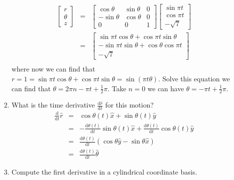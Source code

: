 \documentclass[aps,prl,reprint]{revtex4-1}
\newcommand{\de}{\mathrm{d}}
\begin{document}
\begin{enumerate}
\begin{enumerate}
\begin{eqnarray*}
\begin{bmatrix}
    r\\
    \theta \\
    z
\end{bmatrix}
&=&
\begin{bmatrix}
    \cos\theta & \sin\theta & 0\\
    -\sin\theta & \cos\theta & 0 \\
    0 & 0 & 1
\end{bmatrix}
\begin{bmatrix}
    \sin\pi t\\
    \cos\pi t \\
    -\sqrt{7}
\end{bmatrix} \\
&=&
\begin{bmatrix}
    \sin\pi t \cos\theta + \cos\pi t \sin\theta\\
    -\sin\pi t \sin\theta + \cos\theta \cos\pi t \\
    -\sqrt{7}
\end{bmatrix} \\
\end{eqnarray*}
where now we can find that $r = 1 = \sin\pi t \cos\theta + \cos\pi t \sin\theta = \sin(\pi t \theta)$. Solve this equation we can find that $\theta = 2\pi n - \pi t + \frac{1}{2} \pi$. Take $n = 0$ we can have $\theta = -\pi t + \frac{1}{2}\pi$. 
\item What is the time derivative $\frac{\de \hat{r}}{\de t}$ for this motion?
\begin{eqnarray*}
\frac{\de}{\de t}\hat{r} &=& \cos\theta(t) \hat{x} + \sin\theta(t) \hat{y}\\
&=& -\frac{\de \theta(t)}{\de t} \sin\theta(t) \hat{x} + \frac{\de \theta(t)}{\de t} \cos\theta(t) \hat{y} \\
&=& \frac{\de \theta(t)}{\de t} (\cos\theta \hat{y} - \sin\theta\hat{x}) \\
&=& \frac{\de \theta(t)}{\de t} \hat{\theta}
\end{eqnarray*}
\item Compute the first derivative in a cylindrical coordinate basis.

\end{enumerate}
\end{enumerate}
\end{document}
